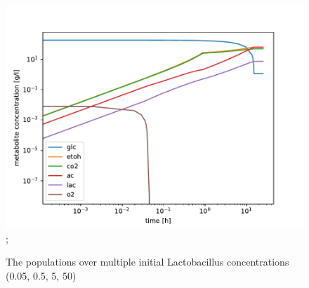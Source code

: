 		\begin{figure}[h]
			\includegraphics[width=\linewidth]{figures/results/cocultures/1_metabolites.pdf};
			\caption{The populations over multiple initial Lactobacillus concentrations (0.05, 0.5, 5, 50)}
			\label{fig:cocult_pops}
		\end{figure}
